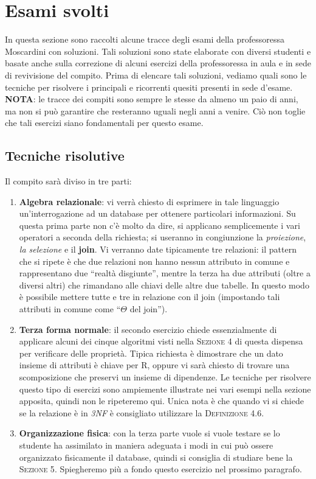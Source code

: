 \section{Esami svolti}
In questa sezione sono raccolti alcune tracce degli esami della professoressa
Moscardini con soluzioni. Tali soluzioni sono state elaborate con diversi studenti
e basate anche sulla correzione di alcuni esercizi della professoressa in aula e 
in sede di revivisione del compito. Prima di elencare tali soluzioni, vediamo quali
sono le tecniche per risolvere i principali e ricorrenti quesiti presenti in sede d'esame.\\
\textbf{NOTA}: le tracce dei compiti sono sempre le stesse da almeno un paio di anni, ma non
si può garantire che resteranno uguali negli anni a venire. Ciò non toglie che tali esercizi 
siano fondamentali per questo esame.
\subsection{Tecniche risolutive}
Il compito sarà diviso in tre parti:
\begin{enumerate}
 \item \textbf {Algebra relazionale}: vi verrà chiesto di esprimere in tale linguaggio
 un'interrogazione ad un database per ottenere particolari informazioni. Su questa prima parte
 non c'è molto da dire, si applicano semplicemente i vari operatori a seconda della richiesta; 
 si useranno in congiunzione la \emph{proiezione}, \emph{la selezione} e il \textbf{join}. 
 Vi verranno date tipicamente tre relazioni: il pattern che si ripete
 è che due relazioni non hanno nessun attributo in comune e rappresentano due ``realtà 
 disgiunte'', mentre la terza ha due attributi (oltre a diversi altri) che rimandano alle chiavi 
 delle altre due tabelle. In questo modo è possibile mettere tutte e tre in relazione con il join 
 (impostando tali attributi in comune come ``$\Theta$ del join'').
 \item \textbf {Terza forma normale}: il secondo esercizio chiede essenzialmente di applicare 
 alcuni dei cinque algoritmi visti nella \textsc{Sezione 4} di questa dispensa per verificare 
 delle proprietà. Tipica richiesta è dimostrare che un dato insieme di attributi è chiave per R, 
 oppure vi sarà chiesto di trovare una scomposizione che preservi un insieme di dipendenze. Le 
 tecniche per risolvere questo tipo di esercizi sono ampiemente illustrate nei vari esempi nella 
 sezione apposita, quindi non le ripeteremo qui. Unica nota è che quando vi si chiede se la 
 relazione è in \emph{3NF} è consigliato utilizzare la \textsc{Definizione 4.6}.
 \item \textbf{Organizzazione fisica}: con la terza parte vuole si vuole testare se lo studente ha
 assimilato in maniera adeguata i modi in cui può ossere organizzato fisicamente il database, quindi 
 si consiglia di studiare bene la \textsc{Sezione 5}. Spiegheremo più a fondo questo esercizio nel 
 prossimo paragrafo.
\end{enumerate}

